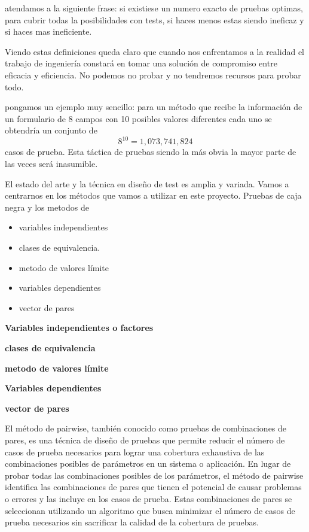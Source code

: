 atendamos a la siguiente frase: si existiese un numero exacto de pruebas optimas, para cubrir todas la posibilidades con tests, si haces menos estas siendo ineficaz y si haces mas ineficiente.

Viendo estas definiciones queda claro que cuando nos enfrentamos a la realidad el trabajo de ingeniería constará en tomar una solución de compromiso entre eficacia y eficiencia. No podemos no probar y no tendremos recursos para probar todo.

pongamos un ejemplo muy sencillo: para un método que recibe la información de un formulario de 8 campos con 10 posibles valores diferentes cada uno se obtendría un conjunto de \[ 8^{10} = 1,073,741,824 \] casos de prueba. Esta táctica de pruebas siendo la más obvia la mayor parte de las veces será inasumible.


El estado del arte y la técnica en diseño de test es amplia y variada. Vamos a centrarnos en los métodos que vamos a utilizar en este proyecto. Pruebas de caja negra y los metodos de

\begin{itemize}
    \item variables independientes
    \item clases de equivalencia.
    \item metodo de valores límite
    \item variables dependientes
    \item vector de pares
\end{itemize}


\textbf{Variables independientes o factores}


\textbf{clases de equivalencia}


\textbf{metodo de valores límite}


\textbf{Variables dependientes}


\textbf{vector de pares}

El método de pairwise, también conocido como pruebas de combinaciones de pares, es una técnica de diseño de pruebas que permite reducir el número de casos de prueba necesarios para lograr una cobertura exhaustiva de las combinaciones posibles de parámetros en un sistema o aplicación. En lugar de probar todas las combinaciones posibles de los parámetros, el método de pairwise identifica las combinaciones de pares que tienen el potencial de causar problemas o errores y las incluye en los casos de prueba. Estas combinaciones de pares se seleccionan utilizando un algoritmo que busca minimizar el número de casos de prueba necesarios sin sacrificar la calidad de la cobertura de pruebas.

